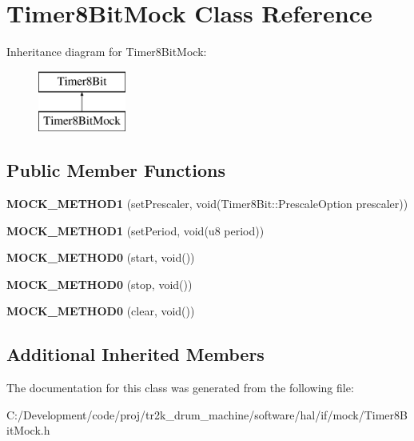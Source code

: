 \hypertarget{class_timer8_bit_mock}{}\section{Timer8\+Bit\+Mock Class Reference}
\label{class_timer8_bit_mock}
Inheritance diagram for Timer8\+Bit\+Mock\+:\begin{figure}[H]
\begin{center}
\leavevmode
\includegraphics[height=2.000000cm]{class_timer8_bit_mock}
\end{center}
\end{figure}
\subsection*{Public Member Functions}
\begin{DoxyCompactItemize}
\item 
\mbox{\label{class_timer8_bit_mock_ad0d2eceefca2f0082dc65ca38179e2c8}} 
{\bfseries M\+O\+C\+K\+\_\+\+M\+E\+T\+H\+O\+D1} (set\+Prescaler, void(Timer8\+Bit\+::\+Prescale\+Option prescaler))
\item 
\mbox{\label{class_timer8_bit_mock_ae1934f7eff83ad0435a28255577c8bd5}} 
{\bfseries M\+O\+C\+K\+\_\+\+M\+E\+T\+H\+O\+D1} (set\+Period, void(u8 period))
\item 
\mbox{\label{class_timer8_bit_mock_a0c35633749bd2633ab1805e9b3ae591c}} 
{\bfseries M\+O\+C\+K\+\_\+\+M\+E\+T\+H\+O\+D0} (start, void())
\item 
\mbox{\label{class_timer8_bit_mock_a750711fcae607ba1a7cf45e64694c689}} 
{\bfseries M\+O\+C\+K\+\_\+\+M\+E\+T\+H\+O\+D0} (stop, void())
\item 
\mbox{\label{class_timer8_bit_mock_a89c93b34218ff2f1d50481d70ab9f007}} 
{\bfseries M\+O\+C\+K\+\_\+\+M\+E\+T\+H\+O\+D0} (clear, void())
\end{DoxyCompactItemize}
\subsection*{Additional Inherited Members}


The documentation for this class was generated from the following file\+:\begin{DoxyCompactItemize}
\item 
C\+:/\+Development/code/proj/tr2k\+\_\+drum\+\_\+machine/software/hal/if/mock/Timer8\+Bit\+Mock.\+h\end{DoxyCompactItemize}
